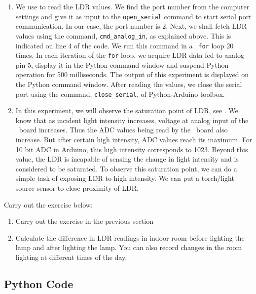 \begin{enumerate}
\item We use  to read the LDR values.  We find the
  port number from the computer settings and give it as input to the
  {\tt open\_serial} command to start serial port communication. In
  our case, the port number is 2. Next, we shall fetch LDR values
  using the command, {\tt cmd\_analog\_in}, as explained above. This
  is indicated on line 4 of the code. We run this command in a {\tt
    for} loop 20 times. In each iteration of the {\tt for} loop, we
  acquire LDR data fed to analog pin 5, display it in the Python
  command window and suspend Python operation for 500
  milliseconds. The output of this experiment is displayed on the Python command
  window. After reading the values, we close the serial port using the
  command, {\tt close\_serial}, of Python-Arduino toolbox.

\item In this experiment, we will observe the saturation point of LDR,
  see .  We know that as incident light intensity
  increases, voltage at analog input of the \arduino\ board
  increases. Thus the ADC values being read by the \arduino\ board also
  increase. But after certain high intensity, ADC values reach its
  maximum. For 10 bit ADC in Arduino, this high intensity corresponds
  to 1023.  Beyond this value, the LDR is incapable of sensing the
  change in light intensity and is considered to be saturated. To
  observe this saturation point, we can do a simple task of exposing
  LDR to high intensity. We can put a torch/light source sensor to
  close proximity of LDR.
\end{enumerate}

\begin{exercise}
Carry out the exercise below:
\begin{enumerate}
\item Carry out the exercise in the previous section
\item Calculate the difference in LDR readings in indoor room
  before lighting the lamp and after lighting the lamp. You can also
  record changes in the room lighting at different times of the day.
\end{enumerate}
\end{exercise}

\subsection{Python Code}
\label{sec:ldr-python-code}

